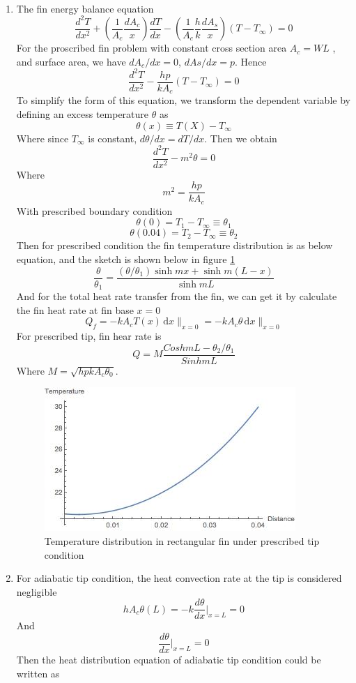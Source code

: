 \begin{solution}
~
\begin{enumerate}
\item
The fin energy balance equation
$$
\frac{d^2 T}{dx^2} + 
\left(\frac{1}{A_c}\frac{dA_c}{x}\right)\frac{dT}{dx}-
\left(\frac{1}{A_c}\frac{h}{k}\frac{dA_s}{x}\right)(T-T_\infty)=0
$$
For the proscribed fin problem with constant cross section area $A_c=WL$ , 
and surface area, we have $dA_c/dx=0$, $dAs/dx=p$. Hence
$$
\frac{d^2 T}{dx^2}-
\frac{hp}{kA_c}(T-T_\infty)=0
$$
To simplify the form of this equation, we transform the dependent variable by 
defining an excess temperature $\theta$ as
$$\theta(x) \equiv T(X)-T_\infty$$
Where since $T_\infty$ is constant, $d\theta/dx=dT/dx$. Then we obtain
$$\frac{d^2 T}{dx^2}-m^2\theta=0$$
Where
$$m^2=\frac{hp}{kA_c}$$
With prescribed boundary condition
$$\theta(0)=T_1-T_\infty \equiv \theta_1$$
$$\theta(0.04)=T_2-T_\infty \equiv \theta_2$$
Then for prescribed condition the fin temperature distribution is as below equation, and the sketch is shown below in figure \ref{fig:2:13}
$$
\frac{\theta}{\theta_1}=
\frac{(\theta/\theta_1)\sinh mx+\sinh m(L-x)}{\sinh mL}
$$
And for the total heat rate transfer from the fin, we can get it by calculate the fin heat rate at fin base $x=0$
$$Q_f= -k A_c T(x) \, \mathrm{d}x\|_{x=0}=-k A_c \theta \, \mathrm{d}x\|_{x=0}$$
For prescribed tip, fin hear rate is 
$$Q=M\frac{CoshmL-\theta_2/\theta_1}{SinhmL}$$
Where $M=\sqrt{hpkA_c\theta_0}$.
\begin{figure}[h!]
  \centering
    \includegraphics[scale=1]{figures/ch2/13}
    \caption{Temperature distribution in rectangular fin under prescribed tip condition}
    \label{fig:2:13}
\end{figure}
\item
For adiabatic tip condition, the heat convection rate at the tip is considered negligible
$$hA_c\theta(L)=-k\frac{d\theta}{dx}|_{x=L}=0$$
And
$$\frac{d\theta}{dx}|_{x=L}=0$$
Then the heat distribution equation of adiabatic tip condition could be written as

\end{enumerate}
\end{solution}
